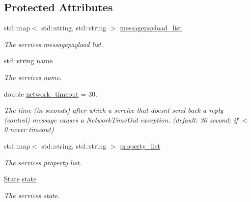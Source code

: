 \subsection*{Protected Attributes}
\begin{DoxyCompactItemize}
\item 
\mbox{\label{classwrench_1_1_service_a63865f20c92027ab626ab1347b0099d2}} 
std\+::map$<$ std\+::string, std\+::string $>$ \hyperlink{classwrench_1_1_service_a63865f20c92027ab626ab1347b0099d2}{messagepayload\+\_\+list}
\begin{DoxyCompactList}\small\item\em The service\textquotesingle{}s messagepayload list. \end{DoxyCompactList}\item 
\mbox{\label{classwrench_1_1_service_aaef1b34d99953a0d9aa7ec1e4560600b}} 
std\+::string \hyperlink{classwrench_1_1_service_aaef1b34d99953a0d9aa7ec1e4560600b}{name}
\begin{DoxyCompactList}\small\item\em The service\textquotesingle{}s name. \end{DoxyCompactList}\item 
\mbox{\label{classwrench_1_1_service_a437f24cdde2bc5130ea3b844e1f5618c}} 
double \hyperlink{classwrench_1_1_service_a437f24cdde2bc5130ea3b844e1f5618c}{network\+\_\+timeout} = 30.
\begin{DoxyCompactList}\small\item\em The time (in seconds) after which a service that doesn\textquotesingle{}t send back a reply (control) message causes a Network\+Time\+Out exception. (default\+: 30 second; if $<$0 never timeout) \end{DoxyCompactList}\item 
\mbox{\label{classwrench_1_1_service_a032143b1e2d7296dde9b4ca1e34845ce}} 
std\+::map$<$ std\+::string, std\+::string $>$ \hyperlink{classwrench_1_1_service_a032143b1e2d7296dde9b4ca1e34845ce}{property\+\_\+list}
\begin{DoxyCompactList}\small\item\em The service\textquotesingle{}s property list. \end{DoxyCompactList}\item 
\mbox{\label{classwrench_1_1_service_ae29f8df5241ef16c760bec037158fc17}} 
\hyperlink{classwrench_1_1_service_a6f4e098718aa5d6f637c694de779e5c7}{State} \hyperlink{classwrench_1_1_service_ae29f8df5241ef16c760bec037158fc17}{state}
\begin{DoxyCompactList}\small\item\em The service\textquotesingle{}s state. \end{DoxyCompactList}\end{DoxyCompactItemize}
